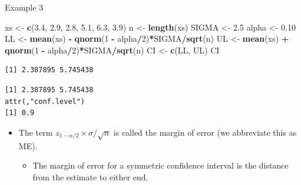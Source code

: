 \documentclass[
  ignorenonframetext,
]{beamer}
\newenvironment{Shaded}{\begin{snugshade}}{\end{snugshade}}
\newcommand{\AttributeTok}[1]{\textcolor[rgb]{0.13,0.29,0.53}{#1}}
\newcommand{\CommentTok}[1]{\textcolor[rgb]{0.56,0.35,0.01}{\textit{#1}}}
\newcommand{\DecValTok}[1]{\textcolor[rgb]{0.00,0.00,0.81}{#1}}
\newcommand{\FloatTok}[1]{\textcolor[rgb]{0.00,0.00,0.81}{#1}}
\newcommand{\FunctionTok}[1]{\textcolor[rgb]{0.13,0.29,0.53}{\textbf{#1}}}
\newcommand{\NormalTok}[1]{#1}
\newcommand{\OtherTok}[1]{\textcolor[rgb]{0.56,0.35,0.01}{#1}}
\newcommand{\SpecialCharTok}[1]{\textcolor[rgb]{0.81,0.36,0.00}{\textbf{#1}}}
\providecommand{\tightlist}{%
  \setlength{\itemsep}{0pt}\setlength{\parskip}{0pt}}
\begin{document}
\begin{frame}[fragile]{Example 3}
\protect\hypertarget{example-3-1}{}
\small

\begin{Shaded}
\begin{Highlighting}[]
\NormalTok{xs }\OtherTok{\textless{}{-}} \FunctionTok{c}\NormalTok{(}\FloatTok{3.4}\NormalTok{, }\FloatTok{2.9}\NormalTok{, }\FloatTok{2.8}\NormalTok{, }\FloatTok{5.1}\NormalTok{, }\FloatTok{6.3}\NormalTok{, }\FloatTok{3.9}\NormalTok{)}
\NormalTok{n }\OtherTok{\textless{}{-}} \FunctionTok{length}\NormalTok{(xs)}
\NormalTok{SIGMA }\OtherTok{\textless{}{-}} \FloatTok{2.5}
\NormalTok{alpha }\OtherTok{\textless{}{-}} \FloatTok{0.10}
\NormalTok{LL }\OtherTok{\textless{}{-}} \FunctionTok{mean}\NormalTok{(xs) }\SpecialCharTok{{-}} \FunctionTok{qnorm}\NormalTok{(}\DecValTok{1} \SpecialCharTok{{-}}\NormalTok{ alpha}\SpecialCharTok{/}\DecValTok{2}\NormalTok{)}\SpecialCharTok{*}\NormalTok{SIGMA}\SpecialCharTok{/}\FunctionTok{sqrt}\NormalTok{(n)}
\NormalTok{UL }\OtherTok{\textless{}{-}} \FunctionTok{mean}\NormalTok{(xs) }\SpecialCharTok{+} \FunctionTok{qnorm}\NormalTok{(}\DecValTok{1} \SpecialCharTok{{-}}\NormalTok{ alpha}\SpecialCharTok{/}\DecValTok{2}\NormalTok{)}\SpecialCharTok{*}\NormalTok{SIGMA}\SpecialCharTok{/}\FunctionTok{sqrt}\NormalTok{(n)}
\NormalTok{CI }\OtherTok{\textless{}{-}} \FunctionTok{c}\NormalTok{(LL, UL)}
\NormalTok{CI}
\end{Highlighting}
\end{Shaded}

\begin{verbatim}
[1] 2.387895 5.745438
\end{verbatim}

\begin{Shaded}
\end{Shaded}

\begin{verbatim}
[1] 2.387895 5.745438
attr(,"conf.level")
[1] 0.9
\end{verbatim}

\normalsize

\begin{itemize}
\item
  The term \(z_{1-\alpha/2}\times \sigma/\sqrt{n}\) is called the margin
  of error (we abbreviate this as ME).

  \begin{itemize}
  \tightlist
  \item
    The margin of error for a symmetric confidence interval is the
    distance from the estimate to either end.
  \end{itemize}
\end{itemize}
\end{frame}
\end{document}
